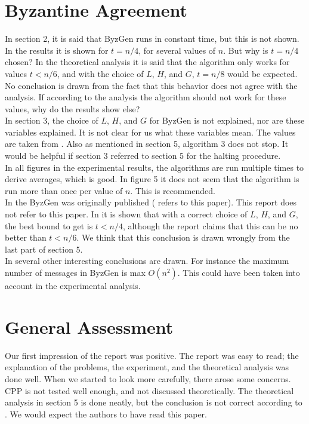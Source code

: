 \documentclass[nocopyrightspace]{acm_proc_article-sp}
\begin{document}
\section{Byzantine Agreement}
In section 2, it is said that ByzGen runs in constant time, but this is not shown. In the results it is shown for $t=n/4$, for several values of $n$. But why is $t=n/4$ chosen? In the theoretical analysis it is said that the algorithm only works for values $t<n/6$, and with the choice of $L$, $H$, and $G$, $t=n/8$ would be expected. No conclusion is drawn from the fact that this behavior does not agree with the analysis. If according to the analysis the algorithm should not work for these values, why do the results show else? \\
In section 3, the choice of $L$, $H$, and $G$ for ByzGen is not explained, nor are these variables explained. It is not clear for us what these variables mean. The values are taken from \cite{motwani2010randomized}. Also as mentioned in section 5, algorithm 3 does not stop. It would be helpful if section 3 referred to section 5 for the halting procedure.\\
In all figures in the experimental results, the algorithms are run multiple times to derive averages, which is good. In figure 5 it does not seem that the algorithm is run more than once per value of $n$. This is recommended. \\
In \cite{rabin1983randomized} the ByzGen was originally published (\cite{motwani2010randomized} refers to this paper). This report does not refer to this paper. In \cite{rabin1983randomized} it is shown that with a correct choice of $L$, $H$, and $G$, the best bound to get is $t < n/4$, although the report claims that this can be no better than $t < n/6$. We think that this conclusion is drawn wrongly from the last part of section 5. \\
In \cite{rabin1983randomized} several other interesting conclusions are drawn. For instance the maximum number of messages in ByzGen is max $O(n^2)$. This could have been taken into account in the experimental analysis.

\section{General Assessment}
Our first impression of the report was positive. The report was easy to read; the explanation of the problems, the experiment, and the theoretical analysis was done well. When we started to look more carefully, there arose some concerns. CPP is not tested well enough, and not discussed theoretically. The theoretical analysis in section 5 is done neatly, but the conclusion is not correct according to \cite{rabin1983randomized}. We would expect the authors to have read this paper.

\balancecolumns
\end{document}
